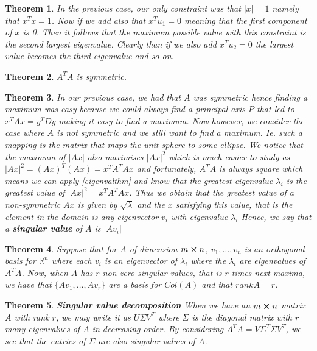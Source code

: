 \documentclass[titlepage]{article}
\newtheorem{thm}{Theorem}[subsection]
\numberwithin{equation}{subsection}
\newcommand{\Rn}{\mathbb{R}^n}
\begin{document}
\begin{thm} In the previous case, our only constraint was that $|x| = 1$ namely that $x^{T}x=1$. Now if we add also that $x^{T}u_{1}=0$ meaning that the first component of $x$ is 0. Then it follows that the maximum possible value with this constraint is the second largest eigenvalue. Clearly than if we also add $x^{T}u_{2}=0$ the largest value becomes the third eigenvalue and so on. 
\end{thm}

\begin{thm}
$A^{T}A$ is symmetric. 
\end{thm}

\begin{thm}
In our previous case, we had that $A$ was symmetric hence finding a maximum was easy because we could always find a principal axis $P$ that led to $x^{T}Ax = y^{T}Dy$ making it easy to find a maximum. Now however, we consider the case where $A$ is not symmetric and we still want to find a maximum. Ie. such a mapping is the matrix that maps the unit sphere to some ellipse. We notice that the maximum of $|Ax|$ also maximises $|Ax|^{2}$ which is much easier to study as  $|Ax|^{2} = (Ax)^{T}(Ax) = x^{T}A^{T}Ax$ and fortunately, $A^{T}A$ is always square which means we can apply \ref{eigenvalthm} and know that the greatest eigenvalue $\lambda_{i}$ is the greatest value of $|Ax|^{2} = x^{T}A^{T}Ax$. Thus we obtain that the greatest value of a non-symmetric $Ax$ is given by $\sqrt{\lambda}$ and the $x$ satisfying this value, that is the element in the domain is any eigenvector $v_{i}$ with eigenvalue $\lambda_{i}$ Hence, we say that a \textbf{singular value} of $A$ is $|Av_{i}|$
\end{thm}


\begin{thm}
Suppose that for $A$ of dimension $m \cross n$, $v_{1}, \hdots, v_{n}$ is an orthogonal basis for $\Rn$ where each $v_{i}$ is an eigenvector of $\lambda_{i}$ where the $\lambda_{i}$ are eigenvalues of $A^{T}A$. Now, when $A$ has $r$ non-zero singular values, that is $r$ times next maxima, we have that $\{Av_{1}, \hdots, Av_{r}\}$ are a basis for $Col(A)$ and that $rank A = r$.
\end{thm}

\begin{thm}\textbf{Singular value decomposition}
When we have an $m\cross n$ matrix $A$ with rank $r$, we may write it as $U\Sigma V^{T}$ where $\Sigma$ is the diagonal matrix with $r$ many eigenvalues of $A$ in decreasing order. By considering $A^{T}A = V\Sigma^{T}\Sigma V^{T}$, we see that the entries of $\Sigma$ are also singular values of $A$.  
\end{thm}
\end{document}
